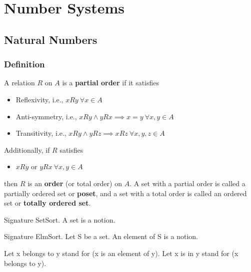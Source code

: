 \section{Number Systems}

\subsection{Natural Numbers}

\subsubsection{Definition}
\begin{true}
A relation $R$ on $A$ is a \textbf{partial order} if it satisfies
\begin{itemize}
    \item Reflexivity, i.e., $xRy \ \forall x \in A$
    \item Anti-symmetry, i.e., $xRy \land yRx \implies x = y \ \forall x,y \in A$
    \item Transitivity, i.e., $xRy \land yRz \implies xRz \ \forall x,y,z \in A$
\end{itemize}
Additionally, if $R$ satisfies
\begin{itemize}
    \item $xRy$ or $yRx \ \forall x,y \in A$
\end{itemize}
then $R$ is an \textbf{order} (or total order) on $A$. A set with a partial order is called a partially ordered set or \textbf{poset}, and a set with a total order is called an ordered set or \textbf{totally ordered set}.
\end{true}
\begin{forthel}

Signature SetSort.
    A set is a notion.

Signature ElmSort.
    Let S be a set.
    An element of S is a notion.

Let x belongs to y stand for (x is an element of y).
Let x is in y stand for (x belongs to y).
\end{forthel}
